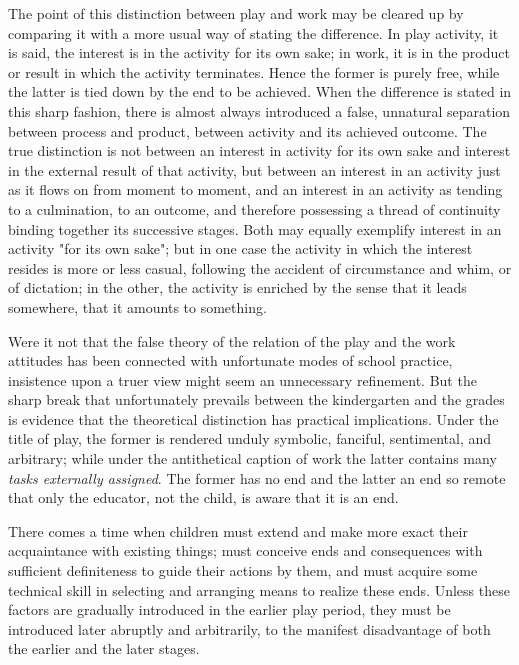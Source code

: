 \documentclass[letterpaper]{book}
\begin{document}
The point of this distinction between play and work may be cleared up by
comparing it with a more usual way of stating the difference. In play
activity, it is said, the interest is in the activity for its own sake;
in work, it is in the product or result in which the activity
terminates. Hence the former is purely free, while the latter is tied
down by the end to be achieved. When the difference is stated in this
sharp fashion, there is almost always introduced a false, unnatural
separation between process and product, between activity and its
achieved outcome. The true distinction is not between an interest in
activity for its own sake and interest in the external result of that
activity, but between an interest in an activity just as it flows on
from moment to moment, and an interest in an activity as tending to a
culmination, to an outcome, and therefore possessing a thread of
continuity binding together its successive stages. Both may equally
exemplify interest in an activity "for its own sake"; but in one case
the activity in which the interest resides is more or less casual,
following the accident of circumstance and whim, or of dictation; in the
other, the activity is enriched by the sense that it leads somewhere,
that it amounts to something.


Were it not that the false theory of the relation of the play and the
work attitudes has been connected with unfortunate modes of school
practice, insistence upon a truer view might seem an unnecessary
refinement. But the sharp break that unfortunately prevails between the
kindergarten and the grades is evidence that the theoretical distinction
has practical implications. Under the title of play, the former is
rendered unduly symbolic, fanciful, sentimental, and arbitrary; while
under the antithetical caption of work the latter
contains
many \emph{tasks externally assigned}. The former has no end and the
latter an end so remote that only the educator, not the child, is aware
that it is an end.

There comes a time when children must extend and make more exact their
acquaintance with existing things; must conceive ends and consequences
with sufficient definiteness to guide their actions by them, and must
acquire some technical skill in selecting and arranging means to realize
these ends. Unless these factors are gradually introduced in the earlier
play period, they must be introduced later abruptly and arbitrarily, to
the manifest disadvantage of both the earlier and the later stages.
\end{document}
